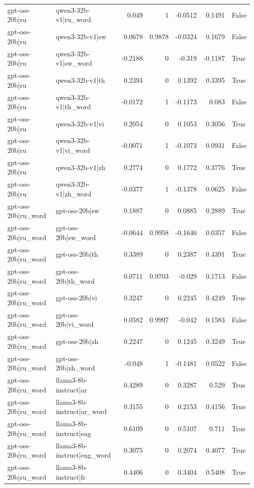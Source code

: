 \begin{table}
\begin{tabular}{l l r r r r l}
gpt-oss-20b|ru & qwen3-32b-v1|ru_word & 0.049 & 1 & -0.0512 & 0.1491 & False \\
gpt-oss-20b|ru & qwen3-32b-v1|sw & 0.0678 & 0.9878 & -0.0324 & 0.1679 & False \\
gpt-oss-20b|ru & qwen3-32b-v1|sw_word & -0.2188 & 0 & -0.319 & -0.1187 & True \\
gpt-oss-20b|ru & qwen3-32b-v1|th & 0.2393 & 0 & 0.1392 & 0.3395 & True \\
gpt-oss-20b|ru & qwen3-32b-v1|th_word & -0.0172 & 1 & -0.1173 & 0.083 & False \\
gpt-oss-20b|ru & qwen3-32b-v1|vi & 0.2054 & 0 & 0.1053 & 0.3056 & True \\
gpt-oss-20b|ru & qwen3-32b-v1|vi_word & -0.0071 & 1 & -0.1073 & 0.0931 & False \\
gpt-oss-20b|ru & qwen3-32b-v1|zh & 0.2774 & 0 & 0.1772 & 0.3776 & True \\
gpt-oss-20b|ru & qwen3-32b-v1|zh_word & -0.0377 & 1 & -0.1378 & 0.0625 & False \\
gpt-oss-20b|ru_word & gpt-oss-20b|sw & 0.1887 & 0 & 0.0885 & 0.2889 & True \\
gpt-oss-20b|ru_word & gpt-oss-20b|sw_word & -0.0644 & 0.9958 & -0.1646 & 0.0357 & False \\
gpt-oss-20b|ru_word & gpt-oss-20b|th & 0.3389 & 0 & 0.2387 & 0.4391 & True \\
gpt-oss-20b|ru_word & gpt-oss-20b|th_word & 0.0711 & 0.9703 & -0.029 & 0.1713 & False \\
gpt-oss-20b|ru_word & gpt-oss-20b|vi & 0.3247 & 0 & 0.2245 & 0.4249 & True \\
gpt-oss-20b|ru_word & gpt-oss-20b|vi_word & 0.0582 & 0.9997 & -0.042 & 0.1583 & False \\
gpt-oss-20b|ru_word & gpt-oss-20b|zh & 0.2247 & 0 & 0.1245 & 0.3249 & True \\
gpt-oss-20b|ru_word & gpt-oss-20b|zh_word & -0.048 & 1 & -0.1481 & 0.0522 & False \\
gpt-oss-20b|ru_word & llama3-8b-instruct|ar & 0.4289 & 0 & 0.3287 & 0.529 & True \\
gpt-oss-20b|ru_word & llama3-8b-instruct|ar_word & 0.3155 & 0 & 0.2153 & 0.4156 & True \\
gpt-oss-20b|ru_word & llama3-8b-instruct|eng & 0.6109 & 0 & 0.5107 & 0.711 & True \\
gpt-oss-20b|ru_word & llama3-8b-instruct|eng_word & 0.3075 & 0 & 0.2074 & 0.4077 & True \\
gpt-oss-20b|ru_word & llama3-8b-instruct|fr & 0.4406 & 0 & 0.3404 & 0.5408 & True \\

\end{tabular}
\end{table}
